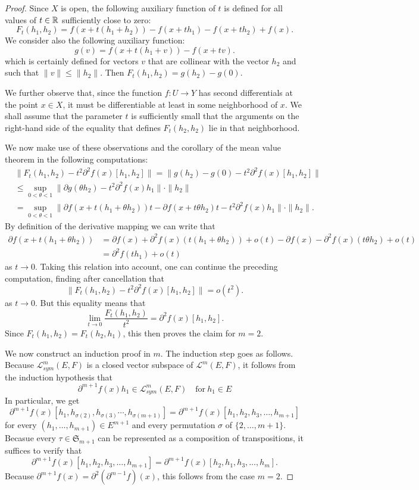 \begin{proof}
Since $X$ is open, the following auxiliary function of $t$ is defined for all values of $t\in\mathbb{R}$ sufficiently close to zero:
\[F_t(h_1,h_2)=f(x+t(h_1+h_2))-f(x+th_1)-f(x+th_2)+f(x).\]
We consider also the following auxiliary function:
\[g(v)=f(x+t(h_1+v))-f(x+tv).\]
which is certainly defined for vectors $v$ that are collinear with the vector $h_2$ and such that $\|v\|\leq\|h_2\|$. Then $F_t(h_1,h_2)=g(h_2)-g(0)$.\par
We further observe that, since the function $f:U\to Y$ has second differentials at the point $x\in X$, it must be differentiable at least in
some neighborhood of $x$. We shall assume that the parameter $t$ is sufficiently small that the arguments on the right-hand side of the equality that defines
$F_t(h_2,h_2)$ lie in that neighborhood.\par
We now make use of these observations and the corollary of the mean value theorem in the following computations:
\begin{align*}
&\|F_t(h_1,h_2)-t^2\partial^2f(x)[h_1,h_2]\|=\|g(h_2)-g(0)-t^2\partial^2f(x)[h_1,h_2]\|\\
&\leq\sup_{0<\theta<1}\|\partial g(\theta h_2)-t^2\partial^2f(x)h_1\|\cdot\|h_2\|\\
&=\sup_{0<\theta<1}\|\partial f(x+t(h_1+\theta h_2))t-\partial f(x+t\theta h_2)t-t^2\partial^2f(x)h_1\|\cdot\|h_2\|.
\end{align*}
By definition of the derivative mapping we can write that
\begin{align*}
\partial f(x+t(h_1+\theta h_2))&=\partial f(x)+\partial^2f(x)(t(h_1+\theta h_2))+o(t)-\partial f(x)-\partial^2f(x)(t\theta h_2)+o(t)\\
&=\partial^2f(th_1)+o(t)
\end{align*}
as $t\to 0$. Taking this relation into account, one can continue the preceding computation, finding after cancellation that
\[\|F_t(h_1,h_2)-t^2\partial^2f(x)[h_1,h_2]\|=o(t^2).\]
as $t\to 0$. But this equality means that
\[\lim_{t\to 0}\frac{F_t(h_1,h_2)}{t^2}=\partial^2f(x)[h_1,h_2].\]
Since $F_t(h_1,h_2)=F_t(h_2,h_1)$, this then proves the claim for $m=2$.\par
We now construct an induction proof in $m$. The induction step goes as follows. Because $\mathcal{L}^m_{sym}(E,F)$ is a closed vector subspace of $\mathcal{L}^m(E,F)$, it follows from the induction hypothesis that 
\[\partial^{m+1}f(x)h_1\in\mathcal{L}^m_{sym}(E,F)\quad\text{for}\ h_1\in E\]
In particular, we get
\[\partial^{m+1}f(x)[h_1,h_{\sigma(2)},h_{\sigma(3)}\cdots,h_{\sigma(m+1)}]=\partial^{m+1}f(x)[h_1,h_2,h_3,\dots,h_{m+1}]\]
for every $(h_1,\dots,h_{m+1})\in E^{m+1}$ and every permutation $\sigma$ of $\{2,\dots,m+1\}$. Becasue every $\tau\in \mathfrak{S}_{m+1}$ can be represented as a composition of transpositions, it suffices to verify that 
\[\partial^{m+1}f(x)[h_1,h_2,h_3,\dots,h_{m+1}]=\partial^{m+1}f(x)[h_2,h_1,h_3,\dots,h_m].\]
Because $\partial^{m+1}f(x)=\partial^2(\partial^{m-1}f)(x)$, this follows from the case $m=2$.
\end{proof}
